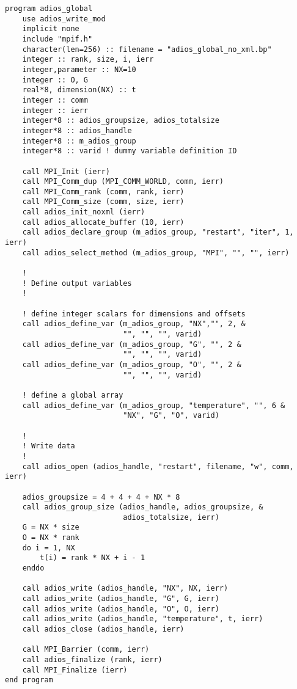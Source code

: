 \begin{lstlisting}[alsolanguage=Fortran,caption={ADIOS no-XML example},label={}]
program adios_global 
    use adios_write_mod
    implicit none
    include "mpif.h"
    character(len=256) :: filename = "adios_global_no_xml.bp" 
    integer :: rank, size, i, ierr
    integer,parameter :: NX=10
    integer :: O, G    
    real*8, dimension(NX) :: t 
    integer :: comm
    integer :: ierr
    integer*8 :: adios_groupsize, adios_totalsize
    integer*8 :: adios_handle
    integer*8 :: m_adios_group
    integer*8 :: varid ! dummy variable definition ID

    call MPI_Init (ierr)
    call MPI_Comm_dup (MPI_COMM_WORLD, comm, ierr)
    call MPI_Comm_rank (comm, rank, ierr) 
    call MPI_Comm_size (comm, size, ierr)
    call adios_init_noxml (ierr)
    call adios_allocate_buffer (10, ierr)
    call adios_declare_group (m_adios_group, "restart", "iter", 1, ierr) 
    call adios_select_method (m_adios_group, "MPI", "", "", ierr)
    
    !
    ! Define output variables
    !

    ! define integer scalars for dimensions and offsets
    call adios_define_var (m_adios_group, "NX","", 2, &
                           "", "", "", varid) 
    call adios_define_var (m_adios_group, "G", "", 2 &
                           "", "", "", varid) 
    call adios_define_var (m_adios_group, "O", "", 2 &
                           "", "", "", varid)
        
    ! define a global array
    call adios_define_var (m_adios_group, "temperature", "", 6 &
                           "NX", "G", "O", varid)

    !
    ! Write data 
    !
    call adios_open (adios_handle, "restart", filename, "w", comm, ierr)
    
    adios_groupsize = 4 + 4 + 4 + NX * 8
    call adios_group_size (adios_handle, adios_groupsize, &
                           adios_totalsize, ierr)
    G = NX * size 
    O = NX * rank 
    do i = 1, NX
        t(i) = rank * NX + i - 1 
    enddo
    
    call adios_write (adios_handle, "NX", NX, ierr)
    call adios_write (adios_handle, "G", G, ierr)
    call adios_write (adios_handle, "O", O, ierr)
    call adios_write (adios_handle, "temperature", t, ierr)
    call adios_close (adios_handle, ierr) 

    call MPI_Barrier (comm, ierr)
    call adios_finalize (rank, ierr)
    call MPI_Finalize (ierr) 
end program
\end{lstlisting}
